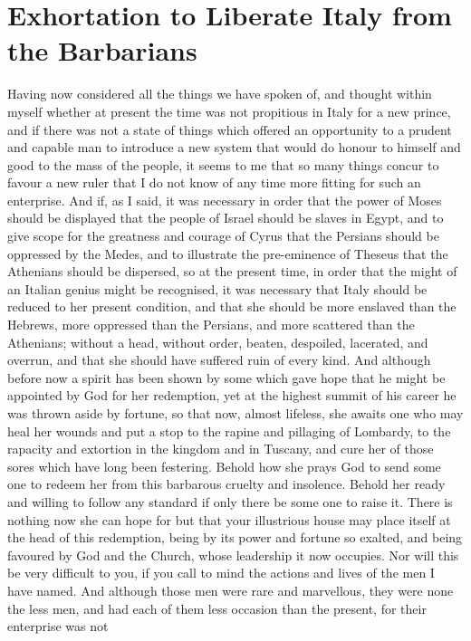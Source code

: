 \documentclass[12pt,letterpaper]{memoir}
\begin{document}
\chapter{Exhortation to Liberate Italy from the Barbarians}

Having now considered all the things we have spoken of, and thought
within myself whether at present the time was not propitious in Italy
for a new prince, and if there was not a state of things which offered
an opportunity to a prudent and capable man to introduce a new system
that would do honour to himself and good to the mass of the people, it
seems to me that so many things concur to favour a new ruler that I do
not know of any time more fitting for such an enterprise. And if, as
I said, it was necessary in order that the power of Moses should be
displayed that the people of Israel should be slaves in Egypt, and to
give scope for the greatness and courage of Cyrus that the Persians
should be oppressed by the Medes, and to illustrate the pre-eminence of
Theseus that the Athenians should be dispersed, so at the present time,
in order that the might of an Italian genius might be recognised, it
was necessary that Italy should be reduced to her present condition,
and that she should be more enslaved than the Hebrews, more oppressed
than the Persians, and more scattered than the Athenians; without a
head, without order, beaten, despoiled, lacerated, and overrun, and
that she should have suffered ruin of every kind. And although before
now a spirit has been shown by some which gave hope that he might be
appointed by God for her redemption, yet at the highest summit of his
career he was thrown aside by fortune, so that now, almost lifeless,
she awaits one who may heal her wounds and put a stop to the rapine and
pillaging of Lombardy, to the rapacity and extortion in the kingdom
and in Tuscany, and cure her of those sores which have long been
festering. Behold how she prays God to send some one to redeem her from
this barbarous cruelty and insolence. Behold her ready and willing to
follow any standard if only there be some one to raise it. There is
nothing now she can hope for but that your illustrious house may place
itself at the head of this redemption, being by its power and fortune
so exalted, and being favoured by God and the Church, whose leadership
it now occupies. Nor will this be very difficult to you, if you call to
mind the actions and lives of the men I have named. And although those
men were rare and marvellous, they were none the less men, and had each
of them less occasion than the present, for their enterprise was not
\end{document}
